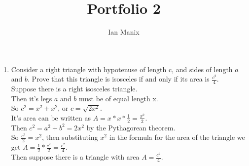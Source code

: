 \documentclass[sigconf]{article}
\title{
  \textbf{Portfolio 2} \\
  }
\author{ 
  Ian Manix
  }
\begin{document}



\maketitle




\begin{enumerate}
  \item Consider a right triangle with hypotenuse of length c, and sides of length $a$ and $b$. Prove that this triangle is isosceles if and only if its area is $\frac{c^2}{4}$.\\
        Suppose there is a right isosceles triangle.\\
        Then it's legs $a$ and $b$ must be of equal length x.\\
        So $c^2=x^2+x^2$, or $c=\sqrt{2x^2}$.\\
        It's area can be written as $A=x*x*\frac{1}{2}=\frac{x^2}{2}$.\\
        Then $c^2=a^2+b^2=2x^2$ by the Pythagorean theorem.\\
        So $\frac{c^2}{2}=x^2$, then substituting $x^2$ in the formula for the area of the triangle we get $A=\frac{1}{2}*\frac{c^2}{2}=\frac{c^2}{4}$.\\
        Then suppose there is a triangle with area $A=\frac{c^2}{4}$.\\




\end{enumerate}
\end{document}
